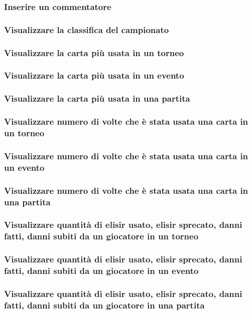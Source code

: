 \documentclass{article}
\begin{document}
\subsubsection{Inserire un commentatore}
\subsubsection{Visualizzare la classifica del campionato}
\subsubsection{Visualizzare la carta più usata in un torneo}
\subsubsection{Visualizzare la carta più usata in un evento}
\subsubsection{Visualizzare la carta più usata in una partita}
\subsubsection{Visualizzare numero di volte che è stata usata una carta in un torneo}
\subsubsection{Visualizzare numero di volte che è stata usata una carta in un evento}
\subsubsection{Visualizzare numero di volte che è stata usata una carta in una partita}
\subsubsection{Visualizzare quantità di elisir usato, elisir sprecato, danni fatti, danni subiti da un giocatore in un torneo}
\subsubsection{Visualizzare quantità di elisir usato, elisir sprecato, danni fatti, danni subiti da un giocatore in un evento}
\subsubsection{Visualizzare quantità di elisir usato, elisir sprecato, danni fatti, danni subiti da un giocatore in una partita}
\end{document}
